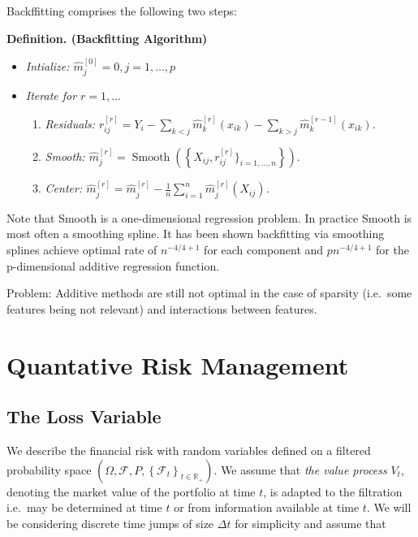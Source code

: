 \documentclass[
]{book}
\providecommand{\tightlist}{%
  \setlength{\itemsep}{0pt}\setlength{\parskip}{0pt}}
\begin{document}
Backffitting comprises the following two steps:

\textbf{Definition. (Backfitting Algorithm)}

\begin{itemize}
\tightlist
\item
  \emph{Intialize: \(\hat m_j^{[0]}=0, j=1,\dots,p\)}
\item
  \emph{Iterate for \(r=1,\dots\)}

  \begin{enumerate}
  \def\labelenumi{\arabic{enumi}.}
  \tightlist
  \item
    \emph{Residuals: \(r_{ij}^{[r]}=Y_i-\sum_{k < j} \hat{m}_{k}^{[r]}(x_{ik})-\sum_{k > j} \hat{m}_{k}^{[r-1]}(x_{ik})\).}
  \item
    \emph{Smooth: \(\hat{m}_j^{[r]}=\operatorname{Smooth}\left(\left\{X_{ij},r_{ij}^{[r]}\}_{i=1,\dots,n}\right\}\right).\)}
  \item
    \emph{Center: \(\hat{m}_j^{[r]}=\hat{m}_j^{[r]}-\frac{1}{n} \sum_{i=1}^n \hat{m}_j^{[r]}\left(X_{i j}\right)\).}
  \end{enumerate}
\end{itemize}

Note that Smooth is a one-dimensional regression problem. In practice Smooth is most often a smoothing spline.
It has been shown backfitting via smoothing splines achieve optimal rate of \(n^{-4/4+1}\) for each component and \(pn^{-4/4+1}\) for the p-dimensional additive regression function.

Problem: Additive methods are still not optimal in the case of sparsity (i.e.~some features being not relevant) and interactions between features.

\hypertarget{quantative-risk-management}{%
\chapter{Quantative Risk Management}\label{quantative-risk-management}}

\hypertarget{the-loss-variable}{%
\section{The Loss Variable}\label{the-loss-variable}}

We describe the financial risk with random variables defined on a filtered probability space \(\left(\Omega,\mathcal{F},P,\left\{\mathcal{F}_t\right\}_{t\in \mathbb{R}_+}\right)\). We assume that \emph{the value process} \(V_t\), denoting the market value of the portfolio at time \(t\), is adapted to the filtration i.e.~may be determined at time \(t\) or from information available at time \(t\). We will be considering discrete time jumps of size \(\Delta t\) for simplicity and assume that
\end{document}
